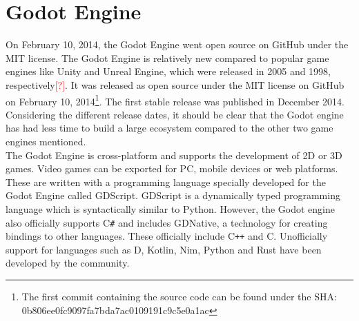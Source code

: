 \section{Godot Engine}
On February 10, 2014, the Godot Engine went open source on GitHub under the MIT license.
The Godot Engine is relatively new compared to popular game engines like Unity and Unreal Engine, which were released in 2005 and 1998, respectively\textcolor{red}{[?]}.
It was released as open source under the MIT license on GitHub on February 10, 2014\footnote{The first commit containing the source code can be found under the SHA:\\ 0b806ee0fc9097fa7bda7ac0109191c9c5e0a1ac}\cite{godot-repository}.
The first stable release was published in December 2014\cite{godot-release}.
Considering the different release dates, it should be clear that the Godot engine has had less time to build a large ecosystem compared to the other two game engines mentioned.\\

The Godot Engine is cross-platform and supports the development of 2D or 3D games\cite{godot-engine}.
Video games can be exported for PC, mobile devices or web platforms.
These are written with a programming language specially developed for the Godot Engine called GDScript.
GDScript is a dynamically typed programming language which is syntactically similar to Python.
However, the Godot engine also officially supports C\texttt{\#} and includes GDNative, a technology for creating bindings to other languages\cite{godot-gdnative}.
These officially include C\texttt{++} and C.
Unofficially support for languages such as D, Kotlin, Nim, Python and Rust have been developed by the community.
